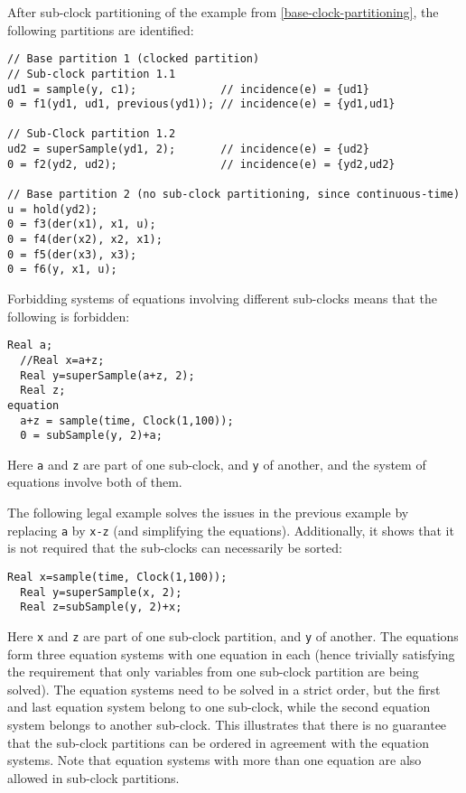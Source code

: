 \begin{example}
After sub-clock partitioning of the example from \cref{base-clock-partitioning}, the following partitions are identified:
\begin{lstlisting}[language=modelica]
// Base partition 1 (clocked partition)
// Sub-clock partition 1.1
ud1 = sample(y, c1);             // incidence(e) = {ud1}
0 = f1(yd1, ud1, previous(yd1)); // incidence(e) = {yd1,ud1}

// Sub-Clock partition 1.2
ud2 = superSample(yd1, 2);       // incidence(e) = {ud2}
0 = f2(yd2, ud2);                // incidence(e) = {yd2,ud2}

// Base partition 2 (no sub-clock partitioning, since continuous-time)
u = hold(yd2);
0 = f3(der(x1), x1, u);
0 = f4(der(x2), x2, x1);
0 = f5(der(x3), x3);
0 = f6(y, x1, u);
\end{lstlisting}
\end{example}

\begin{example}
Forbidding systems of equations involving different sub-clocks means that the following is forbidden:
\begin{lstlisting}[language=modelica]
  Real a;
  //Real x=a+z;
  Real y=superSample(a+z, 2);
  Real z;
equation
  a+z = sample(time, Clock(1,100));
  0 = subSample(y, 2)+a;
\end{lstlisting}
Here \lstinline!a! and \lstinline!z! are part of one sub-clock, and \lstinline!y! of another, and the system of equations involve both of them.

The following legal example solves the issues in the previous example by replacing \lstinline!a! by \lstinline!x-z! (and simplifying the equations).
Additionally, it shows that it is not required that the sub-clocks can necessarily be sorted:
\begin{lstlisting}[language=modelica]
  Real x=sample(time, Clock(1,100));
  Real y=superSample(x, 2);
  Real z=subSample(y, 2)+x;
\end{lstlisting}
Here \lstinline!x! and \lstinline!z! are part of one sub-clock partition, and \lstinline!y! of another.
The equations form three equation systems with one equation in each (hence trivially satisfying the requirement that only variables from one sub-clock partition are being solved).
The equation systems need to be solved in a strict order, but the first and last equation system belong to one sub-clock, while the second equation system belongs to another sub-clock.
This illustrates that there is no guarantee that the sub-clock partitions can be ordered in agreement with the equation systems.
Note that equation systems with more than one equation are also allowed in sub-clock partitions.
\end{example}

